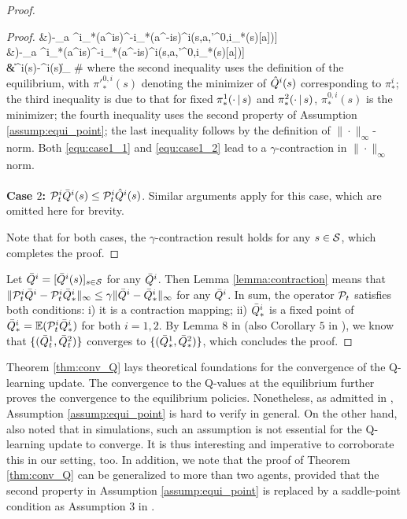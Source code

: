 \begin{proof}
\begin{proof}
	&\leq \gamma \bigg[\sum_{a\in\cA} \pi^i_*(a^i\given s)\pi^{-i}_*(a^{-i}\given s)\oQ^i\big(s,a,\pi'^{0,i}_*(s)[a]\big)-\sum_{a\in\cA} \pi^i_*(a^i\given s)\hpi^{-i}_*(a^{-i}\given s)\hQ^i\big(s,a,\pi'^{0,i}_{*}(s)[a]\big)\bigg]\notag\\
	&\leq \gamma \bigg[\sum_{a\in\cA} \pi^i_*(a^i\given s)\hpi^{-i}_*(a^{-i}\given s)\oQ^i\big(s,a,\pi'^{0,i}_*(s)[a]\big)-\sum_{a\in\cA} \pi^i_*(a^i\given s)\hpi^{-i}_*(a^{-i}\given s)\hQ^i\big(s,a,\pi'^{0,i}_{*}(s)[a]\big)\bigg]\notag\\
	&\leq \gamma \|\oQ^i(s)-\hQ^i(s)\|_{\infty}\label{equ:case1_2}
	\#
	\normalsize
	where the second inequality uses the definition of the equilibrium, with 
	$\pi'^{0,i}_*(s)$ denoting the minimizer of $\hQ^i(s)$ corresponding to $\pi^i_*$; the third inequality is due to that for fixed $\pi^1_*(\cdot{\,|\,} s)$ and $\pi^2_*(\cdot{\,|\,} s)$, $\pi^{0,i}_*(s)$ is the minimizer; the fourth inequality uses the second property of Assumption \ref{assump:equi_point}; the last inequality follows by the definition of $\|\cdot\|_\infty$-norm. Both \eqref{equ:case1_1} and \eqref{equ:case1_2} lead to a $\gamma$-contraction in $\|\cdot\|_\infty$ norm. 
	\\
	\vspace{-5pt}
	\\
	\noindent \textbf{Case $2$:} $\cP^i_t\oQ^i(s)\leq \cP^i_t\hQ^i(s)$. Similar arguments apply for this case, which are omitted here for brevity.
	
	Note that for both cases, the $\gamma$-contraction result holds for any $s\in{\mathcal{S}}$, which completes the proof. 
	\end{proof}
	
	Let $\bar{Q}^i=[\bar{Q}^i(s)]_{s\in{\mathcal{S}}}$ for any $\bar{Q}^i$. Then Lemma \ref{lemma:contraction} means that $\|\mathcal{P}^i_t\bar{Q}^i-\mathcal{P}^i_t\bar{Q}^i_*\|_{\infty}\leq \gamma\|\bar{Q}^i-\bar{Q}^i_*\|_{\infty}$ for any $\bar{Q}^i$. In sum, the operator $\mathcal{P}_t$ satisfies both conditions: i) it is a contraction mapping; ii) $\bar{Q}^i_*$ is a fixed point of $\bar{Q}^i_*=\mathbb{E}(\mathcal{P}^i_t \bar{Q}^i_*)$ for both $i=1,2$. By Lemma $8$ in \cite{hu2003nash} (also Corollary $5$ in \cite{szepesvari1999unified}), we know that $\{(\bar{Q}^1_t,\bar{Q}^2_t)\}$ converges to $\{(\bar{Q}^1_*,\bar{Q}^2_*)\}$, which concludes the proof. 
\end{proof}

 
Theorem \ref{thm:conv_Q} lays theoretical foundations for the convergence  of the Q-learning update. The convergence to the Q-values at the equilibrium further proves the convergence to the equilibrium policies. Nonetheless, as admitted in \cite{hu2003nash}, Assumption \ref{assump:equi_point} is hard to verify in general. On the other hand, \cite{hu2003nash} also noted that in simulations, such an assumption is not essential for the Q-learning update to converge. It is thus interesting and imperative to corroborate this in our setting, too. In addition, we note that the proof of Theorem \ref{thm:conv_Q} can be generalized to more than two agents, provided that the second property in Assumption \ref{assump:equi_point} is replaced by a saddle-point condition as Assumption $3$ in \cite{hu2003nash}. 

